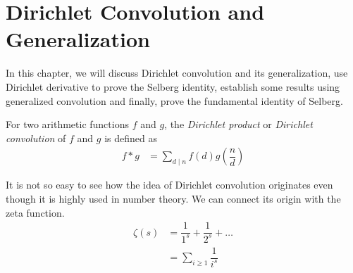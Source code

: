\documentclass[elemannt.tex]{subfile}
\begin{document}
    \chapter{Dirichlet Convolution and Generalization}
    In this chapter, we will discuss Dirichlet convolution and its generalization, use Dirichlet derivative to prove the Selberg identity, establish some results using generalized convolution and finally, prove the fundamental identity of Selberg.
        \begin{definition}
            For two arithmetic functions $f$ and $g$, the \textit{Dirichlet product} or \textit{Dirichlet convolution} of $f$ and $g$ is defined as
                \begin{align*}
                    f\ast g
                        & = \sum_{d\mid n}f(d)g\left(\dfrac{n}{d}\right)
                \end{align*}
        \end{definition}
    It is not so easy to see how the idea of Dirichlet convolution originates even though it is highly used in number theory. We can connect its origin with the zeta function.
        \begin{align*}
            \zeta(s)
                & = \dfrac{1}{1^{s}}+\dfrac{1}{2^{s}}+\ldots\\
                & = \sum_{i\geq 1}\dfrac{1}{i^{s}}
        \end{align*}
    
\end{document}
